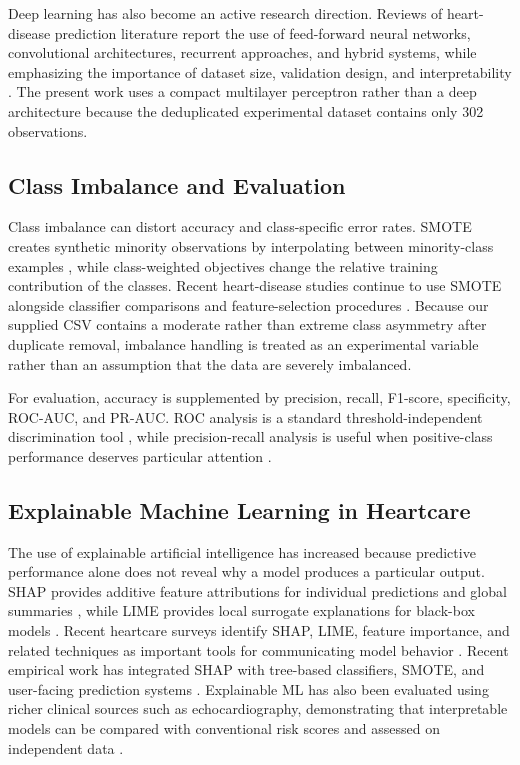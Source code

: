\documentclass[10pt]{article}
\begin{document}
Deep learning has also become an active research direction. Reviews of heart-disease prediction literature report the use of feed-forward neural networks, convolutional architectures, recurrent approaches, and hybrid systems, while emphasizing the importance of dataset size, validation design, and interpretability \citep{zhou2024deep,alsekait2025cnn}. The present work uses a compact multilayer perceptron rather than a deep architecture because the deduplicated experimental dataset contains only 302 observations.

\subsection{Class Imbalance and Evaluation}
Class imbalance can distort accuracy and class-specific error rates. SMOTE creates synthetic minority observations by interpolating between minority-class examples \citep{chawla2002smote}, while class-weighted objectives change the relative training contribution of the classes. Recent heart-disease studies continue to use SMOTE alongside classifier comparisons and feature-selection procedures \citep{elsofany2024proposed,shah2025hybrid}. Because our supplied CSV contains a moderate rather than extreme class asymmetry after duplicate removal, imbalance handling is treated as an experimental variable rather than an assumption that the data are severely imbalanced.

For evaluation, accuracy is supplemented by precision, recall, F1-score, specificity, ROC-AUC, and PR-AUC. ROC analysis is a standard threshold-independent discrimination tool \citep{fawcett2006roc}, while precision-recall analysis is useful when positive-class performance deserves particular attention \citep{saito2015precision}.

\subsection{Explainable Machine Learning in Heartcare}
The use of explainable artificial intelligence has increased because predictive performance alone does not reveal why a model produces a particular output. SHAP provides additive feature attributions for individual predictions and global summaries \citep{lundberg2017unified}, while LIME provides local surrogate explanations for black-box models \citep{ribeiro2016should}. Recent heartcare surveys identify SHAP, LIME, feature importance, and related techniques as important tools for communicating model behavior \citep{sreeja2024explainability}. Recent empirical work has integrated SHAP with tree-based classifiers, SMOTE, and user-facing prediction systems \citep{elsofany2024proposed,ahmed2024ecg,ganie2025ensemble,cenitta2026xai}. Explainable ML has also been evaluated using richer clinical sources such as echocardiography, demonstrating that interpretable models can be compared with conventional risk scores and assessed on independent data \citep{molenaar2024echo}.
\end{document}
